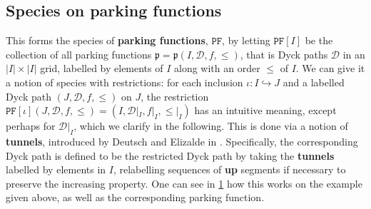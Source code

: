 \documentclass[12pt, reqno]{amsart}
\theoremstyle{definition}
\begin{document}
\subsection{Species on parking functions}

This forms the species of \textbf{parking functions}, $\mathtt{PF}$, by letting $\mathtt{PF}[I]$ be the collection of all parking functions $\mathfrak{p} = \mathfrak{p}(I, \mathcal D, f, \leq)$, that is Dyck paths $\mathcal D$ in an $|I|\times |I|$ grid, labelled by elements of $I$ along with an order $\leq$ of $I$.
We can give it a notion of species with restrictions: for each inclusion $\iota : I \hookrightarrow J $ and a labelled Dyck path $(J, \mathcal D, f, \leq)$ on $J$, the restriction $\mathtt{PF}[\iota](J, \mathcal D, f, \leq) = (I, \mathcal D|_I, f|_I, \leq|_I)$ has an intuitive meaning, except perhaps for
$\mathcal D|_I$, which we clarify in the following.
This is done via a notion of \textbf{tunnels}, introduced by Deutsch and Elizalde in \cite{elizalde2003simple}.
Specifically, the corresponding Dyck path is defined to be the restricted Dyck path by taking the \textbf{tunnels} labelled by elements in $I$, relabelling sequences of \textbf{up} segments if necessary to preserve the increasing property.
One can see in \cref{fig:restriction_parking} how this works on the example given above, as well as the corresponding parking function.


\begin{figure}[h]
\centering
    \qquad
    \caption{\label{fig:restriction_parking}}%
\end{figure}
\end{document}
